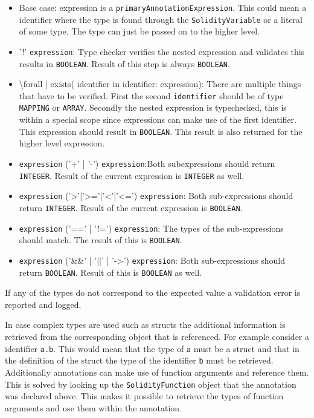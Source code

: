 \documentclass[a4paper]{article}
\begin{document}
\begin{itemize}
  \item Base case: expression is a \texttt{primaryAnnotationExpression}. This could mean a identifier where the type is found through the \texttt{SolidityVariable} or a literal of some type. The type can just be passed on to the higher level.
  \item '!' \texttt{expression}: Type checker verifies the nested expression and validates this results in \texttt{BOOLEAN}. Result of this step is always \texttt{BOOLEAN}.
  \item \textbackslash forall | exists( identifier  in identifier: expression): There are multiple things that have to be verified. First the second \texttt{identifier} should be of type \texttt{MAPPING} or \texttt{ARRAY}. Secondly the nested expression is typechecked, this is within a special scope since expressions can make use of the first identifier. This expression should result in \texttt{BOOLEAN}. This result is also returned for the higher level expression.
  \item \texttt{expression} ('+' | '-') \texttt{expression}:Both subexpressions should return \texttt{INTEGER}. Result of the current expression is \texttt{INTEGER} as well.
  \item \texttt{expression} ('>'|'>='|'<'|'<=') \texttt{expression}: Both sub-expressions should return \texttt{INTEGER}. Result of the current expression is \texttt{BOOLEAN}.
  \item \texttt{expression} ('==' | '!=') \texttt{expression}: The types of the sub-expressions should match. The result of this is \texttt{BOOLEAN}.
  \item \texttt{expression} ('\&\&' | '||' | '->') \texttt{expression}: Both sub-expressions should return \texttt{BOOLEAN}. Result of this is \texttt{BOOLEAN} as well.
\end{itemize}
If any of the types do not correspond to the expected value a validation error is reported and logged. \par
In case complex types are used such as structs the additional information is retrieved from the corresponding object that is referenced. For example consider a identifier \texttt{a.b}. This would mean that the type of \texttt{a} must be a struct and that in the definition of the struct the type of the identifier \texttt{b} must be retrieved. Additionally annotations can make use of function arguments and reference them. This is solved by looking up the \texttt{SolidityFunction} object that the annotation was declared above. This makes it possible to retrieve the types of function arguments and use them within the annotation.
\end{document}
